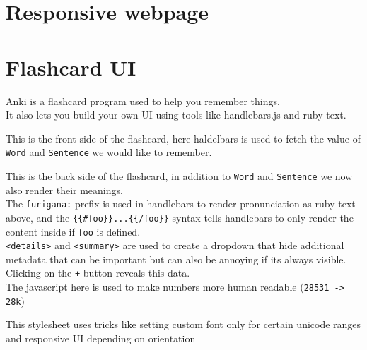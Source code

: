 \documentclass[12pt]{article}
\begin{document}
\section{Responsive webpage}
\newpage

\section{Flashcard UI}
{\Large \raggedright
  Anki is a flashcard program used to help you remember things. \\
  It also lets you build your own UI using tools like handlebars.js and ruby text. \\
}
\vspace*{3\baselineskip}

{\Large \raggedright
  This is the front side of the flashcard, here haldelbars is used to fetch the value of \verb|Word| and \verb|Sentence| we would like to remember. \\
}
\newpage

{\Large \raggedright
  This is the back side of the flashcard, in addition to \verb|Word| and \verb|Sentence| we now also render their meanings. \\
  \vspace*{1\baselineskip}
  The \verb|furigana:| prefix is used in handlebars to render pronunciation as ruby text above, and the \verb|{{#foo}}...{{/foo}}| syntax tells handlebars to only render the content inside if \verb|foo| is defined. \\
  \vspace*{1\baselineskip}
  \verb|<details>| and \verb|<summary>| are used to create a dropdown that hide additional metadata that can be important but can also be annoying if its always visible. Clicking on the \verb|+| button reveals this data. \\
  \vspace*{1\baselineskip}
  The javascript here is used to make numbers more human readable (\verb|28531 -> 28k|) \\
}
\newpage

\vspace*{1\baselineskip}
{\Large \raggedright
  This stylesheet uses tricks like setting custom font only for certain unicode ranges and responsive UI depending on orientation \\
}
\end{document}
